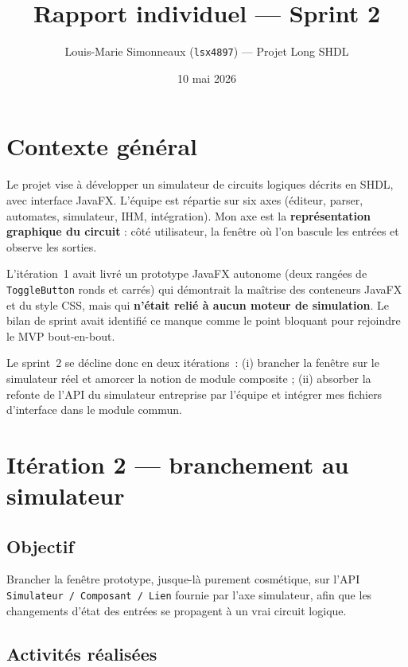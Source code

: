 \documentclass[11pt,a4paper]{article}
\title{\vspace{-1.5cm}Rapport individuel --- Sprint 2}
\author{Louis-Marie Simonneaux (\texttt{lsx4897}) --- Projet Long SHDL}
\date{10 mai 2026}
\begin{document}
\maketitle
\vspace{-1.5em}

\section*{Contexte g\'en\'eral}

Le projet vise \`a d\'evelopper un simulateur de circuits logiques d\'ecrits en SHDL, avec interface JavaFX. L'\'equipe est r\'epartie sur six axes (\'editeur, parser, automates, simulateur, IHM, int\'egration). Mon axe est la \textbf{repr\'esentation graphique du circuit} : c\^ot\'e utilisateur, la fen\^etre o\`u l'on bascule les entr\'ees et observe les sorties.

L'it\'eration~1 avait livr\'e un prototype JavaFX autonome (deux rang\'ees de \texttt{Toggle\-Button} ronds et carr\'es) qui d\'emontrait la ma\^itrise des conteneurs JavaFX et du style CSS, mais qui \textbf{n'\'etait reli\'e \`a aucun moteur de simulation}. Le bilan de sprint avait identifi\'e ce manque comme le point bloquant pour rejoindre le MVP bout-en-bout.

Le sprint~2 se d\'ecline donc en deux it\'erations~: (i) brancher la fen\^etre sur le simulateur r\'eel et amorcer la notion de module composite ; (ii) absorber la refonte de l'API du simulateur entreprise par l'\'equipe et int\'egrer mes fichiers d'interface dans le module commun.

\section{It\'eration 2 --- branchement au simulateur}

\subsection*{Objectif}

Brancher la fen\^etre prototype, jusque-l\`a purement cosm\'etique, sur l'API \texttt{Simulateur~/ Composant~/ Lien} fournie par l'axe simulateur, afin que les changements d'\'etat des entr\'ees se propagent \`a un vrai circuit logique.

\subsection*{Activit\'es r\'ealis\'ees}
\end{document}
